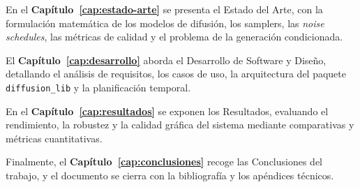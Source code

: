 En el \textbf{Capítulo~\ref{cap:estado-arte}} se presenta el Estado del Arte,
con la formulación matemática de los modelos de difusión, los samplers, las
\emph{noise schedules}, las métricas de calidad y el problema de la
generación condicionada.

El \textbf{Capítulo~\ref{cap:desarrollo}} aborda el Desarrollo de Software y
Diseño, detallando el análisis de requisitos, los casos de uso, la
arquitectura del paquete \texttt{diffusion\_lib} y la planificación temporal.

En el \textbf{Capítulo~\ref{cap:resultados}} se exponen los Resultados,
evaluando el rendimiento, la robustez y la calidad gráfica del sistema
mediante comparativas y métricas cuantitativas.

Finalmente, el \textbf{Capítulo~\ref{cap:conclusiones}} recoge las
Conclusiones del trabajo, y el documento se cierra con la bibliografía y los
apéndices técnicos.

